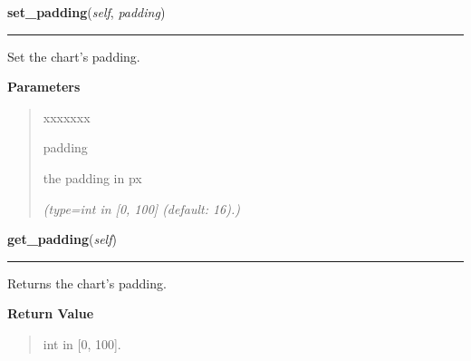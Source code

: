 \hspace{.8\funcindent}\begin{boxedminipage}{\funcwidth}

    \raggedright \textbf{set\_padding}(\textit{self}, \textit{padding})

    \vspace{-1.5ex}

    \rule{\textwidth}{0.5\fboxrule}
\setlength{\parskip}{2ex}
    Set the chart's padding.

\setlength{\parskip}{1ex}
      \textbf{Parameters}
      \vspace{-1ex}

      \begin{quote}
        \begin{Ventry}{xxxxxxx}

          \item[padding]

          the padding in px

            {\it (type=int in [0, 100] (default: 16).)}

        \end{Ventry}

      \end{quote}

    \end{boxedminipage}

    \label{pygtk_chart:chart:Chart:get_padding}

    \vspace{0.5ex}

\hspace{.8\funcindent}\begin{boxedminipage}{\funcwidth}

    \raggedright \textbf{get\_padding}(\textit{self})

    \vspace{-1.5ex}

    \rule{\textwidth}{0.5\fboxrule}
\setlength{\parskip}{2ex}
    Returns the chart's padding.

\setlength{\parskip}{1ex}
      \textbf{Return Value}
    \vspace{-1ex}

      \begin{quote}
      int in [0, 100].

      \end{quote}

    \end{boxedminipage}


